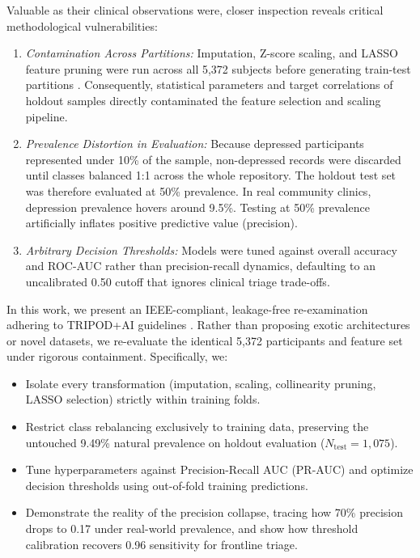 \documentclass[conference]{IEEEtran}
\begin{document}
Valuable as their clinical observations were, closer inspection reveals critical methodological vulnerabilities:
\begin{enumerate}
    \item \textit{Contamination Across Partitions:} Imputation, Z-score scaling, and LASSO feature pruning were run across all 5,372 subjects before generating train-test partitions \cite{kapoor2023}. Consequently, statistical parameters and target correlations of holdout samples directly contaminated the feature selection and scaling pipeline.
    \item \textit{Prevalence Distortion in Evaluation:} Because depressed participants represented under 10\% of the sample, non-depressed records were discarded until classes balanced 1:1 across the whole repository. The holdout test set was therefore evaluated at 50\% prevalence. In real community clinics, depression prevalence hovers around 9.5\%. Testing at 50\% prevalence artificially inflates positive predictive value (precision).
    \item \textit{Arbitrary Decision Thresholds:} Models were tuned against overall accuracy and ROC-AUC rather than precision-recall dynamics, defaulting to an uncalibrated 0.50 cutoff that ignores clinical triage trade-offs.
\end{enumerate}

In this work, we present an IEEE-compliant, leakage-free re-examination adhering to TRIPOD+AI guidelines \cite{collins2024}. Rather than proposing exotic architectures or novel datasets, we re-evaluate the identical 5,372 participants and feature set under rigorous containment. Specifically, we:
\begin{itemize}
    \item Isolate every transformation (imputation, scaling, collinearity pruning, LASSO selection) strictly within training folds.
    \item Restrict class rebalancing exclusively to training data, preserving the untouched 9.49\% natural prevalence on holdout evaluation ($N_{\text{test}} = 1,075$).
    \item Tune hyperparameters against Precision-Recall AUC (PR-AUC) and optimize decision thresholds using out-of-fold training predictions.
    \item Demonstrate the reality of the precision collapse, tracing how 70\% precision drops to 0.17 under real-world prevalence, and show how threshold calibration recovers 0.96 sensitivity for frontline triage.
\end{itemize}
\end{document}

